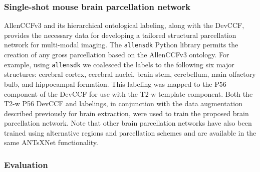 \documentclass[
  12pt,
]{article}
\begin{document}
\subsubsection{Single-shot mouse brain parcellation
network}\label{single-shot-mouse-brain-parcellation-network}

AllenCCFv3 and its hierarchical ontological labeling, along with the
DevCCF, provides the necessary data for developing a tailored structural
parcellation network for multi-modal imaging. The \texttt{allensdk}
Python library permits the creation of any gross parcellation based on
the AllenCCFv3 ontology. For example, using \texttt{allensdk} we
coalesced the labels to the following six major structures: cerebral
cortex, cerebral nuclei, brain stem, cerebellum, main olfactory bulb,
and hippocampal formation. This labeling was mapped to the P56 component
of the DevCCF for use with the T2-w template component. Both the T2-w
P56 DevCCF and labelings, in conjunction with the data augmentation
described previously for brain extraction, were used to train the
proposed brain parcellation network. Note that other brain parcellation
networks have also been trained using alternative regions and
parcellation schemes and are available in the same ANTsXNet
functionality.

\subsubsection{Evaluation}\label{evaluation}
\end{document}

